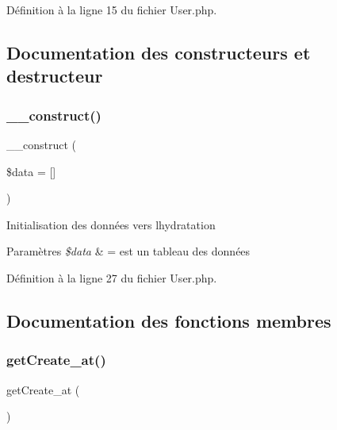 Définition à la ligne 15 du fichier User.\+php.



\subsection{Documentation des constructeurs et destructeur}
\mbox{\label{class_src_1_1_entity_1_1_user_ab3129f1d71e9f51353de9d551ea381d7}} 
\subsubsection{\texorpdfstring{\+\_\+\+\_\+construct()}{\_\_construct()}}
{\footnotesize\ttfamily \+\_\+\+\_\+construct (\begin{DoxyParamCaption}\item[{}]{\$data = {\ttfamily \mbox{[}\mbox{]}} }\end{DoxyParamCaption})}

Initialisation des données vers l\textquotesingle{}hydratation 
\begin{DoxyParams}{Paramètres}
{\em \$data} & = est un tableau des données \\
\hline
\end{DoxyParams}


Définition à la ligne 27 du fichier User.\+php.



\subsection{Documentation des fonctions membres}
\mbox{\label{class_src_1_1_entity_1_1_user_ae5e6c0bedcef3f514100c20ee92c901a}} 
\subsubsection{\texorpdfstring{get\+Create\+\_\+at()}{getCreate\_at()}}
{\footnotesize\ttfamily get\+Create\+\_\+at (\begin{DoxyParamCaption}{ }\end{DoxyParamCaption})}



